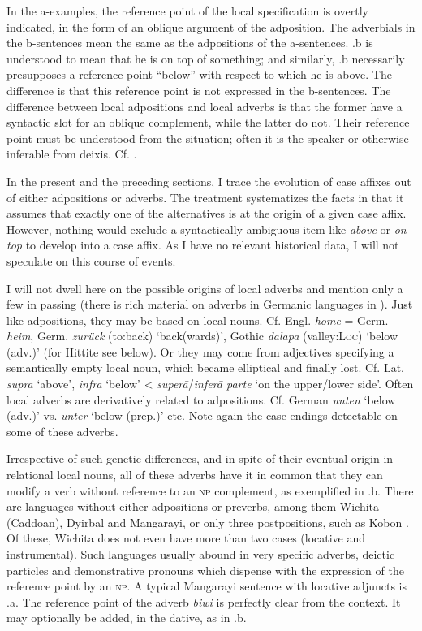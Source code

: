 \noindent In the a-examples, the reference point of the local specification is overtly indicated, in the form of an oblique argument of the adposition. The adverbials in the b-sentences mean the same as the adpositions of the a-sentences. .b is understood to mean that he is on top of something; and similarly, .b necessarily presupposes a reference point “below” with respect to which he is above. The difference is that this reference point is not expressed in the b-sentences. The difference between local adpositions and local adverbs is that the former have a syntactic slot for an oblique complement, while the latter do not. Their reference point must be understood from the situation; often it is the speaker or otherwise inferable from deixis. Cf. \citealt[150f]{Matthews1981}.

In the present and the preceding sections, I trace the evolution of case affixes out of either adpositions or adverbs. The treatment systematizes the facts in that it assumes that exactly one of the alternatives is at the origin of a given case affix. However, nothing would exclude a syntactically ambiguous item like \textit{above} or \textit{on top} to develop into a case affix. As I have no relevant historical data, I will not speculate on this course of events.

I will not dwell here on the possible origins of local adverbs and mention only a few in passing (there is rich material on adverbs in Germanic languages in \citealt[173--175]{Ramat1980}). Just like adpositions, they may be based on local nouns. Cf. Engl. \textit{home} = Germ. \textit{heim}, Germ. \textit{zurück} (to:back) ‘back(wards)’, Gothic \textit{dalapa} (valley:\textsc{Loc}) ‘below (adv.)’ (for Hittite see below). Or they may come from adjectives specifying a semantically empty local noun, which became elliptical and finally lost. Cf. Lat. \textit{supra} ‘above’, \textit{infra} ‘below’ {\textless} \textit{super\=a}/\textit{infer\=a parte} ‘on the upper/lower side’. Often local adverbs are derivatively related to adpositions. Cf. German \textit{unten} ‘below (adv.)’ vs. \textit{unter} ‘below (prep.)’ etc. Note again the case endings detectable on some of these adverbs.

Irrespective of such genetic differences, and in spite of their eventual origin in relational local nouns, all of these adverbs have it in common that they can modify a verb without reference to an \textsc{np} complement, as exemplified in .b. There are languages without either adpositions or preverbs, among them Wichita (Caddoan), Dyirbal and Mangarayi, or only three postpositions, such as Kobon \citep[205f]{Davies1981}. Of these, Wichita does not even have more than two cases (locative and instrumental). Such languages usually abound in very specific adverbs, deictic particles and demonstrative pronouns which dispense with the expression of the reference point by an \textsc{np}. A typical Mangarayi sentence with locative adjuncts is .a. The reference point of the adverb \textit{biwi} is perfectly clear from the context. It may optionally be added, in the dative, as in .b.

